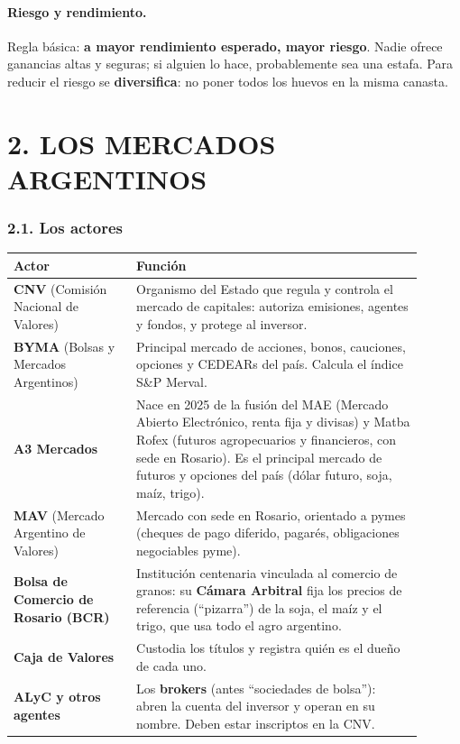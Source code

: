 \paragraph*{Riesgo y rendimiento.}
Regla básica: \textbf{a mayor rendimiento esperado, mayor riesgo}. Nadie ofrece ganancias altas
y seguras; si alguien lo hace, probablemente sea una estafa. Para reducir el riesgo se
\textbf{diversifica}: no poner todos los huevos en la misma canasta.

\section*{2. LOS MERCADOS ARGENTINOS}

\subsubsection*{2.1. Los actores}
\begin{center}
\small
\begin{tabular}{|p{0.27\linewidth}|p{0.63\linewidth}|}
\hline
\textbf{Actor} & \textbf{Función} \\ \hline
\textbf{CNV} (Comisión Nacional de Valores) & Organismo del Estado que regula y controla el
mercado de capitales: autoriza emisiones, agentes y fondos, y protege al inversor. \\ \hline
\textbf{BYMA} (Bolsas y Mercados Argentinos) & Principal mercado de acciones, bonos, cauciones,
opciones y CEDEARs del país. Calcula el índice S\&P Merval. \\ \hline
\textbf{A3 Mercados} & Nace en 2025 de la fusión del MAE (Mercado Abierto Electrónico, renta
fija y divisas) y Matba Rofex (futuros agropecuarios y financieros, con sede en Rosario). Es
el principal mercado de futuros y opciones del país (dólar futuro, soja, maíz, trigo). \\ \hline
\textbf{MAV} (Mercado Argentino de Valores) & Mercado con sede en Rosario, orientado a pymes
(cheques de pago diferido, pagarés, obligaciones negociables pyme). \\ \hline
\textbf{Bolsa de Comercio de Rosario (BCR)} & Institución centenaria vinculada al comercio de
granos: su \textbf{Cámara Arbitral} fija los precios de referencia (``pizarra'') de la soja,
el maíz y el trigo, que usa todo el agro argentino. \\ \hline
\textbf{Caja de Valores} & Custodia los títulos y registra quién es el dueño de cada uno. \\
\hline
\textbf{ALyC y otros agentes} & Los \textbf{brokers} (antes ``sociedades de bolsa''): abren la
cuenta del inversor y operan en su nombre. Deben estar inscriptos en la CNV. \\ \hline
\end{tabular}
\end{center}

